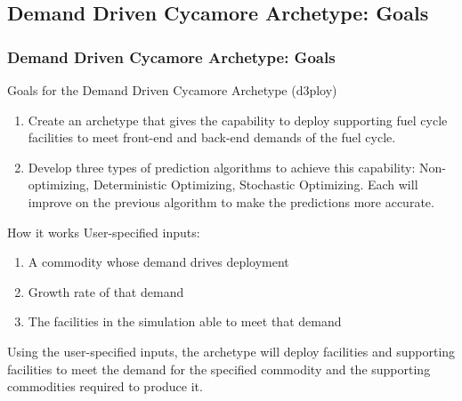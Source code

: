 \subsection{Demand Driven Cycamore Archetype: Goals}
\begin{frame}
  \frametitle{Demand Driven Cycamore Archetype: Goals}

\begin{block}{Goals for the Demand Driven Cycamore Archetype (d3ploy)}
\begin{enumerate}
	\item Create an archetype that gives \Cyclus the capability to deploy supporting fuel cycle facilities to meet front-end and back-end demands of the fuel cycle. 
	\item Develop three types of prediction algorithms to achieve this capability: Non-optimizing, Deterministic Optimizing, Stochastic Optimizing. Each will improve on the previous algorithm to make the predictions more accurate. 
\end{enumerate}
\end{block}

\begin{block}{How it works}
User-specified inputs: 
\begin{enumerate}
	\item A commodity whose demand drives deployment
	\item Growth rate of that demand
	\item The facilities in the simulation able to meet that demand
\end{enumerate}
Using the user-specified inputs, the archetype will deploy facilities and supporting facilities to meet the demand for the specified commodity and the supporting commodities required to produce it. 
\end{block}

\end{frame}

